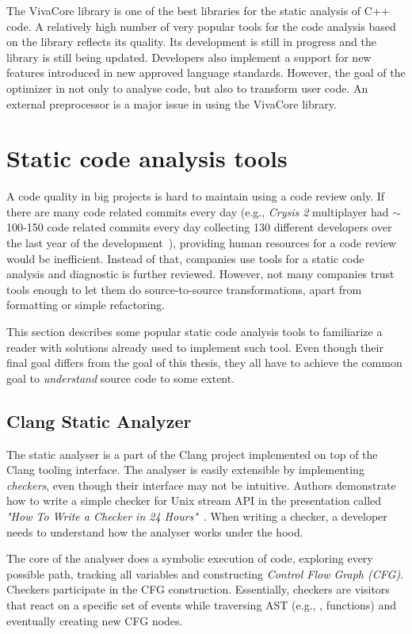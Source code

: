 The VivaCore library is one of the best libraries for the static analysis of C++ code. A relatively high number of very popular tools for the code analysis based on the library reflects its quality. Its development is still in progress and the library is still being updated. Developers also implement a support for new features introduced in new approved language standards. However, the goal of the optimizer in not only to analyse code, but also to transform user code. An external preprocessor is a major issue in using the VivaCore library.

\section{Static code analysis tools}
A code quality in big projects is hard to maintain using a code review only. If there are many code related commits every day (e.g., \emph{Crysis 2} multiplayer had $\sim$100-150 code related commits every day collecting 130 different developers over the last year of the development~\cite{crysis}), providing human resources for a code review would be inefficient. Instead of that, companies use tools for a static code analysis and diagnostic is further reviewed. However, not many companies trust tools enough to let them do source-to-source transformations, apart from formatting or simple refactoring.

This section describes some popular static code analysis tools to familiarize a reader with solutions already used to implement such tool. Even though their final goal differs from the goal of this thesis, they all have to achieve the common goal to \textit{understand} source code to some extent.

\subsection{Clang Static Analyzer}
\label{clang-analyzer}
The static analyser is a part of the Clang project implemented on top of the Clang tooling interface. The analyser is easily extensible by implementing \emph{checkers}, even though their interface may not be intuitive. Authors demonstrate how to write a simple checker for  Unix stream API in the presentation called \textit{"How To Write a Checker in 24 Hours"}~\cite{clang-analyzer-presentation}. When writing a checker, a developer needs to understand how the analyser works under the hood.

The core of the analyser does a symbolic execution of code, exploring every possible path, tracking all variables and constructing \emph{Control Flow Graph (CFG)}. Checkers participate in the CFG construction. Essentially, checkers are visitors that react on a specific set of events while traversing AST (e.g., ,  functions) and eventually creating new CFG nodes.

